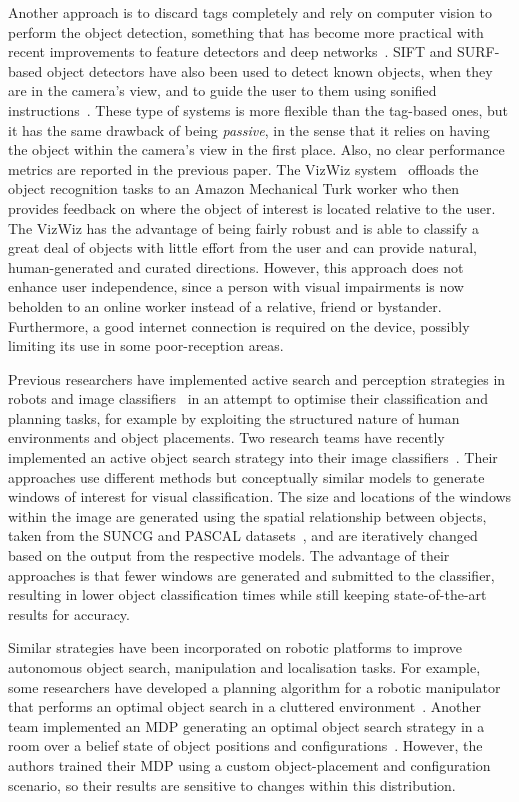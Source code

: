 \documentclass[a4paper, twoside]{article}
\begin{document}
Another approach is to discard tags completely and rely on computer vision to perform the object detection, something that has become more practical with recent improvements to feature detectors and deep networks~\cite{huang2017speed,redmon2016you}. SIFT and SURF-based object detectors have also been used to detect known objects, when they are in the camera's view, and to guide the user to them using sonified instructions~\cite{schauerte2012assistive}. These type of systems is more flexible than the tag-based ones, but it has the same drawback of being {\em passive}, in the sense that it relies on having the object within the camera's view in the first place. Also, no clear performance metrics are reported in the previous paper. The VizWiz system~\cite{bigham2010vizwiz} offloads the object recognition tasks to an Amazon Mechanical Turk worker who then provides feedback on where the object of interest is located relative to the user. The VizWiz has the advantage of being fairly robust and is able to classify a great deal of objects with little effort from the user and can provide natural, human-generated and curated directions. However, this approach does not enhance user independence, since a person with visual impairments is now beholden to an online worker instead of a relative, friend or bystander. Furthermore, a good internet connection is required on the device, possibly limiting its use in some poor-reception areas.

Previous researchers have implemented active search and perception strategies in robots and image classifiers~\cite{Bajcsy2017} in an attempt to optimise their classification and planning tasks, for example by exploiting the structured nature of human environments and object placements. 
%
Two research teams have recently implemented an active object search strategy into their image classifiers~\cite{caicedo2015active,gonzalez2015active}. Their approaches use different methods but conceptually similar models to generate windows of interest for visual classification. The size and locations of the windows within the image are generated using the spatial relationship between objects, taken from the SUNCG and PASCAL datasets~\cite{song2016ssc,Everingham10}, and are iteratively changed based on the output from the respective models. The advantage of their approaches is that fewer windows are generated and submitted to the classifier, resulting in lower object classification times while still keeping state-of-the-art results for accuracy. 

Similar strategies have been incorporated on robotic platforms to improve autonomous object search, manipulation and localisation tasks. For example, some researchers have developed a planning algorithm for a robotic manipulator that performs an optimal object search in a cluttered environment~\cite{dogar2014object}. Another team implemented an MDP generating an optimal object search strategy in a room over a belief state of object positions and configurations~\cite{aydemir2011search}. However, the authors trained their MDP using a custom object-placement and configuration scenario, so their results are sensitive to changes within this distribution. 
\end{document}
